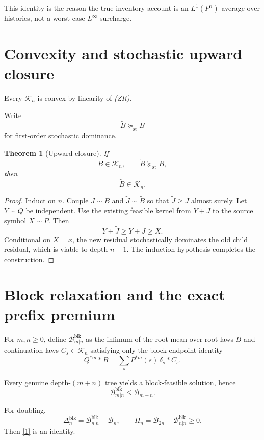 \documentclass[11pt,a4paper]{article}
\newcommand{\Bcal}{\mathcal B}
\newcommand{\Kcal}{\mathcal K}
\newcommand{\blk}{\mathrm{blk}}
\newcommand{\st}{\mathrm{st}}
\newtheorem{theorem}{Theorem}
\begin{document}
This identity is the reason the true inventory account is an
\(L^1(P^n)\)-average over histories, not a worst-case \(L^\infty\) surcharge.

\section{Convexity and stochastic upward closure}

Every \(\Kcal_n\) is convex by linearity of \emph{(ZR)}.

Write
\[
\widetilde B\succeq_{\st}B
\]
for first-order stochastic dominance.

\begin{theorem}[Upward closure]
If
\[
B\in\Kcal_n,
\qquad
\widetilde B\succeq_{\st}B,
\]
then
\[
\boxed{\widetilde B\in\Kcal_n.}
\tag{8}
\]
\end{theorem}

\begin{proof}
Induct on \(n\).
Couple \(J\sim B\) and \(\widetilde J\sim\widetilde B\) so that
\(\widetilde J\ge J\) almost surely.
Let \(Y\sim Q\) be independent.
Use the existing feasible kernel from \(Y+J\) to the source symbol \(X\sim P\).
Then
\[
Y+\widetilde J\ge Y+J\ge X.
\]
Conditional on \(X=x\), the new residual stochastically dominates the old
child residual, which is viable to depth \(n-1\).
The induction hypothesis completes the construction.
\end{proof}

\section{Block relaxation and the exact prefix premium}

For \(m,n\ge0\), define \(\Bcal^{\blk}_{m|n}\) as the infimum of the root mean
over root laws \(B\) and continuation laws \(C_s\in\Kcal_n\) satisfying only
the block endpoint identity
\begin{equation}
\boxed{
Q^{*m}*B
=
\sum_sP^{*m}(s)\,\delta_s*C_s.
}
\tag{BLK}
\end{equation}

Every genuine depth-\((m+n)\) tree yields a block-feasible solution, hence
\[
\boxed{
\Bcal^{\blk}_{m|n}\le\Bcal_{m+n}.
}
\tag{9}
\]

For doubling,
\[
\boxed{
\Delta_n^{\blk}
=
\Bcal^{\blk}_{n|n}-\Bcal_n,
\qquad
\Pi_n
=
\Bcal_{2n}-\Bcal^{\blk}_{n|n}\ge0.
}
\tag{10}
\]
Then \eqref{1} is an identity.
\end{document}
